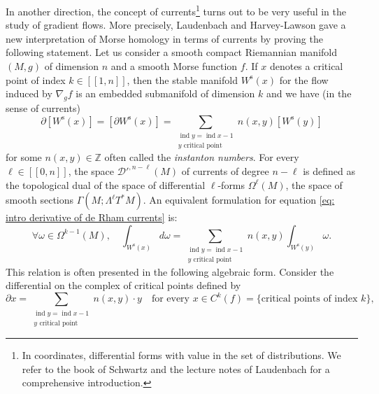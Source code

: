 \documentclass[JEP,XML,SOM,Unicode,NoEqCountersInSection,NoFloatCountersInSection,published]{cedram}
\newcommand{\lcr}{[\![}
\newcommand{\rcr}{]\!]}
\newcommand{\rs}{\mathrm{s}}
\theoremstyle{definition}
\theoremstyle{plain}
\newcommand{\D}{\mathcal{D}}
\newcommand{\Z}{\mathbb{Z}}
\DeclareMathOperator{\ind}{ind}
\begin{document}
In another direction, the concept of currents\footnote{In coordinates, differential forms with value in the set of distributions. We refer to the book of Schwartz \cite{schwartz} and the lecture notes of Laudenbach \cite{laudenbach-book} for a comprehensive introduction.} turns out to be very useful in the study of gradient flows. More precisely, Laudenbach \cite{laudenbach} and Harvey-Lawson \cite{harvey-lawson} gave a new interpretation of Morse homology in terms of currents by proving the following statement. Let us consider a smooth compact Riemannian manifold $(M,g)$ of dimension $n$ and a smooth Morse function $f$. If $x$ denotes a critical point of index $k\in\lcr1,n\rcr$, then the stable manifold $W^\rs (x)$ for the flow induced by $\nabla_g f$ is an embedded submanifold of dimension $k$ and we have (in the sense of currents)
\begin{equation}\label{eq: intro derivative of de Rham currents}
\partial [W^\rs (x)] = [\partial W^\rs (x)] = \sum_{\substack{\ind y = \ind x - 1 \\ y \text{ critical point}}} n(x,y)[W^\rs (y)]
\end{equation}
for some $n(x,y) \in \Z$ often called the \textit{instanton numbers}. For every $\ell\in\lcr0,n\rcr$, the space $\D'^{,n-\ell} (M)$ of currents of degree $n-\ell$ is defined as the topological dual of the space of differential $\ell$-forms $\Omega^{\ell} (M)$, \ie the space of smooth sections $\Gamma (M; \Lambda^{\ell} T^* M)$. An equivalent formulation for equation \eqref{eq: intro derivative of de Rham currents} is:
\[
\forall \omega \in \Omega^{k-1} (M), \quad \int_{W^\rs(x)} d\omega = \sum_{\substack{\ind y = \ind x - 1 \\ y \text{ critical point}}} n(x,y) \int_{W^\rs (y)} \omega.
\]
This relation is often presented in the following algebraic form. Consider the differential on the complex of critical points defined by
\[
\partial x = \sum_{\substack{\ind y = \ind x - 1 \\y \text{ critical point}}} n(x,y)\cdot y \quad \text{for every }x \in C^k (f) = \{ \text{critical points of index }k \},
\]
\end{document}
